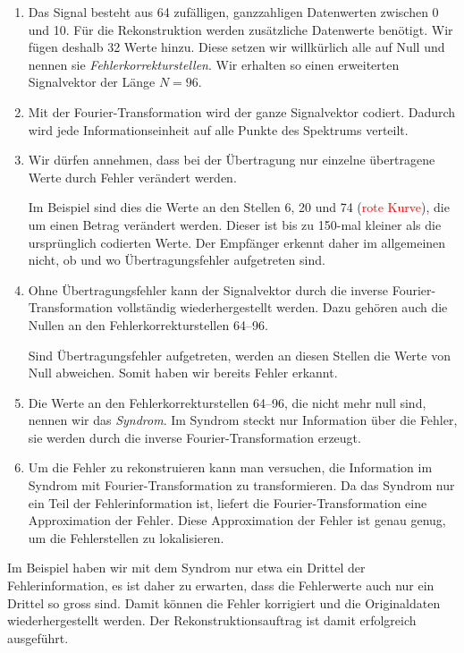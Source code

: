 \begin{enumerate}[(1)]
 \item Das Signal besteht aus 64 zufälligen, ganzzahligen Datenwerten zwischen 0 und 10.
 Für die Rekonstruktion werden zusätzliche Datenwerte benötigt. Wir fügen deshalb 32 Werte hinzu.
 Diese setzen wir willkürlich alle auf Null und nennen sie {\em Fehlerkorrekturstellen}.
%
 Wir erhalten so einen erweiterten Signalvektor der Länge $N =96$.
%
 \item Mit der Fourier-Transformation wird der ganze Signalvektor codiert.
 Dadurch wird jede Informationseinheit auf alle Punkte des Spektrums verteilt.
 \item Wir dürfen annehmen, dass bei der Übertragung nur einzelne übertragene 
 	Werte durch Fehler verändert werden.
 \par 
 Im Beispiel sind dies die Werte an den Stellen 6, 20 und 74 (\textcolor{red}{rote Kurve}),
 	die um einen Betrag verändert werden.
 Dieser ist bis zu 150-mal kleiner als die ursprünglich codierten Werte. 
 Der Empfänger erkennt daher im allgemeinen nicht, ob und wo Übertragungsfehler aufgetreten sind.
 \item Ohne Übertragungsfehler kann der Signalvektor durch die inverse Fourier-Transformation vollständig
 	wiederhergestellt werden.
 Dazu gehören auch die Nullen an den Fehlerkorrekturstellen 64--96.
 \par 
 Sind Übertragungsfehler aufgetreten, werden an diesen Stellen die Werte von Null abweichen.
 Somit haben wir bereits Fehler erkannt.
 \item Die Werte an den Fehlerkorrekturstellen 64--96, die nicht mehr null sind, nennen wir das {\em Syndrom}.
%
 Im Syndrom steckt nur Information über die Fehler, sie werden durch die inverse Fourier-Transformation erzeugt.
 \item Um die Fehler zu rekonstruieren kann man versuchen, die Information im Syndrom mit Fourier-Transformation zu transformieren.
 Da das Syndrom nur ein Teil der Fehlerinformation ist, liefert die Fourier-Transformation eine Approximation der Fehler.
 Diese Approximation der Fehler ist genau genug, um die Fehlerstellen zu lokalisieren.
\end{enumerate}
Im Beispiel haben wir mit dem Syndrom nur etwa ein Drittel der Fehlerinformation, es ist daher zu erwarten, 
dass die Fehlerwerte auch nur ein Drittel so gross sind.
Damit können die Fehler korrigiert und die Originaldaten wiederhergestellt werden.
Der Rekonstruktionsauftrag ist damit erfolgreich ausgeführt.

